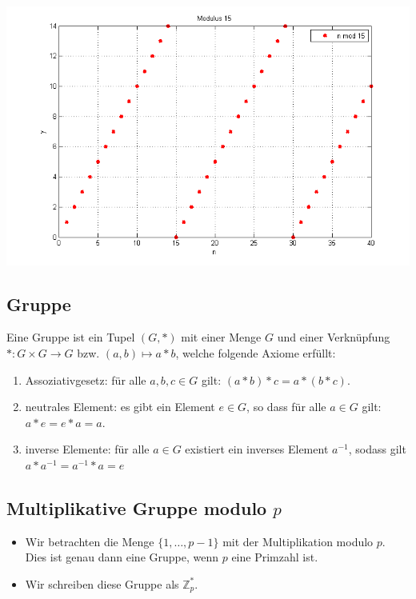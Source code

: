 \documentclass[utf8]{beamer}
\newcommand{\Z}{\mathbb{Z}}
\begin{document}
\begin{frame}{\insertsubsectionhead}
  \begin{center}
    \includegraphics[width=\textwidth]{Modulus.png}
  \end{center}
\end{frame}

\subsection{Gruppe}
\label{sub:gruppe}

\begin{frame}{\insertsubsectionhead}
  Eine Gruppe ist ein Tupel $(G, *)$ mit einer Menge $G$ und einer
  Verknüpfung $*: G \times G \to G$ bzw. $(a, b) \mapsto a * b$, welche
  folgende Axiome erfüllt:
  \begin{enumerate}
    \item Assoziativgesetz: für alle $a,b,c \in G$ gilt: $(a * b) * c = a
      * (b * c)$.
    \item neutrales Element: es gibt ein Element $e \in G$, so dass für
      alle $a \in G$ gilt: $a * e = e * a = a$.
    \item inverse Elemente: für alle $a \in G$ existiert ein inverses
      Element $a^{-1}$, sodass gilt $a * a^{-1} = a^{-1} * a = e$
  \end{enumerate}
\end{frame}

\subsection{Multiplikative Gruppe modulo $p$}
\label{sub:multiplikative_gruppe_modulo_p}

\begin{frame}{\insertsubsectionhead}
  \begin{itemize}
    \item Wir betrachten die Menge $\{1, \dots, p-1\}$ mit der Multiplikation
      modulo $p$. Dies ist genau dann eine Gruppe, wenn $p$ eine Primzahl ist.
    \item Wir schreiben diese Gruppe als $\Z_p^*$.
  \end{itemize}
\end{frame}
\end{document}
